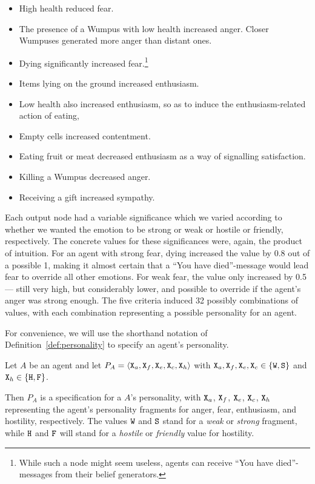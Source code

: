 \begin{itemize}
	\item High health reduced fear.
	\item The presence of a Wumpus with low health increased anger. Closer Wumpuses generated more anger than distant ones.
	\item Dying significantly increased fear.\footnote{While such a node might seem useless, agents can receive ``You have died''-messages from their belief generators.}
	\item Items lying on the ground increased enthusiasm.
	\item Low health also increased enthusiasm, so as to induce the enthusiasm-related action of eating,
	\item Empty cells increased contentment.
	\item Eating fruit or meat decreased enthusiasm as a way of signalling satisfaction.
	\item Killing a Wumpus decreased anger.
	\item Receiving a gift increased sympathy.
\end{itemize}

Each output node had a variable significance which we varied according to whether we wanted the emotion to be strong or weak or hostile or friendly, respectively. The concrete values for these significances were, again, the product of intuition. For an agent with strong fear, dying increased the value by 0.8 out of a possible 1, making it almost certain that a ``You have died''-message would lead fear to override all other emotions. For weak fear, the value only increased by 0.5 --- still very high, but considerably lower, and possible to override if the agent's anger was strong enough. The five criteria induced 32 possibly combinations of values, with each combination representing a possible personality for an agent.

For convenience, we will use the shorthand notation of Definition~\ref{def:personality} to specify an agent's personality.

\begin{definition}\label{def:personality}
   Let $A$ be an agent and let $P_A = \langle \mathtt{X}_a, \mathtt{X}_f, \mathtt{X}_e, \mathtt{X}_c, \mathtt{X}_h \rangle$ with $\mathtt{X}_a, \mathtt{X}_f, \mathtt{X}_e, \mathtt{X}_c \in \{ \mathtt{W}, \mathtt{S} \}$ and $\mathtt{X}_h \in \{ \mathtt{H}, \mathtt{F} \}$.
   
   Then $P_A$ is a specification for a $A$'s personality, with $\mathtt{X}_a$, $\mathtt{X}_f$, $\mathtt{X}_e$, $\mathtt{X}_c$, $\mathtt{X}_h$ representing the agent's personality fragments for anger, fear, enthusiasm, and hostility, respectively. The values $\mathtt{W}$ and $\mathtt{S}$ stand for a \emph{weak} or \emph{strong} fragment, while $\mathtt{H}$ and $\mathtt{F}$ will stand for a \emph{hostile} or \emph{friendly} value for hostility.
\end{definition}

